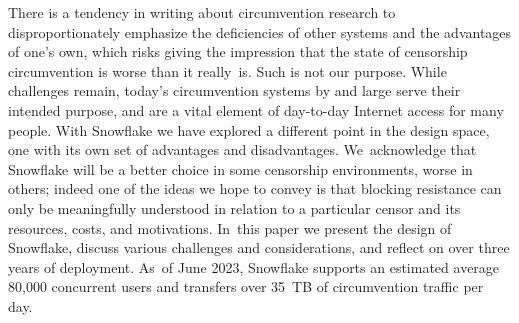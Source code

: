 \documentclass[letterpaper,twocolumn]{article}
\begin{document}
There is a tendency
in writing about circumvention research
to disproportionately emphasize the deficiencies
of other systems and the advantages of one's own,
which risks giving the impression that the state of censorship circumvention
is worse than it really~is.
Such is not our purpose.
While challenges remain,
today's circumvention systems by and large
serve their intended purpose,
and are a vital element of day-to-day Internet access for many people.
With Snowflake we have explored a different point in the design space,
one with its own set of advantages and disadvantages.
We~acknowledge that Snowflake will be a better choice in some
censorship environments,
worse in others;
indeed one of the ideas we hope to convey
is that blocking resistance
can only be meaningfully understood in relation to a particular censor
and its resources, costs, and motivations.
In~this paper we present the design of Snowflake,
discuss various challenges and considerations,
and reflect on over three years of deployment.
As~of June 2023, Snowflake supports an estimated average 80,000 concurrent users
and transfers over 35~TB of circumvention traffic per day.
\end{document}
